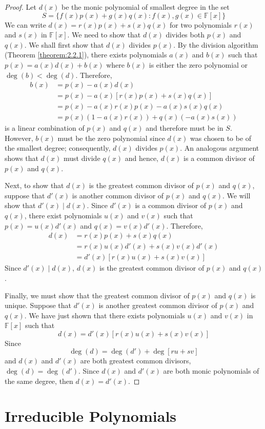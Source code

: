 \documentclass[11pt]{book}
\theoremstyle{definition}\newtheorem{definition}[subsection]{Definition}
\theoremstyle{definition}\newtheorem{example}[subsection]{Example}
\theoremstyle{definition}\newtheorem{notation}[subsection]{Notation}
\theoremstyle{definition}\newtheorem{remark}[subsection]{Remark}
\theoremstyle{theorem}\newtheorem{theorem}[subsection]{Theorem}
\theoremstyle{theorem}\newtheorem{lemma}[subsection]{Lemma}
\theoremstyle{theorem}\newtheorem{proposition}[subsection]{Proposition}
\theoremstyle{theorem}\newtheorem{corollary}[subsection]{Corollary}
\newcommand{\F}{\mathbb{F}}
\begin{document}
\begin{proof}
    Let $d(x)$ be the monic polynomial of smallest degree in the set
    \begin{equation*}
        S = \{f(x)p(x) + g(x)q(x) : f(x), g(x) \in \F[x]\}
    \end{equation*}
    We can write $d(x) = r(x)p(x) + s(x)q(x)$ for two polynomials $r(x)$ and $s(x)$ in $\F[x]$. We need to show that $d(x)$ divides both $p(x)$ and $q(x)$. We shall first show that $d(x)$ divides $p(x)$. By the division algorithm (Theorem \ref{theorem:2.2.1}), there exists polynomials $a(x)$ and $b(x)$ such that $p(x) = a(x)d(x) + b(x)$ where $b(x)$ is either the zero polynomial or $\deg(b) < \deg(d)$. Therefore,
    \begin{align*}
        b(x) &= p(x) - a(x)d(x) \\
        &= p(x) - a(x)[r(x)p(x) + s(x)q(x)] \\
        &= p(x) - a(x)r(x)p(x) - a(x)s(x)q(x) \\
        &= p(x)(1 - a(x)r(x)) + q(x)(-a(x)s(x))
    \end{align*}
    is a linear combination of $p(x)$ and $q(x)$ and therefore must be in $S$. However, $b(x)$ must be the zero polynomial since $d(x)$ was chosen to be of the smallest degree; consequently, $d(x)$ divides $p(x)$. An analogous argument shows that $d(x)$ must divide $q(x)$ and hence, $d(x)$ is a common divisor of $p(x)$ and $q(x)$.

    Next, to show that $d(x)$ is the greatest common divisor of $p(x)$ and $q(x)$, suppose that $d'(x)$ is another common divisor of $p(x)$ and $q(x)$. We will show that $d'(x) \mid d(x)$. Since $d'(x)$ is a common divisor of $p(x)$ and $q(x)$, there exist polynomials $u(x)$ and $v(x)$ such that $p(x) = u(x)d'(x)$ and $q(x) = v(x)d'(x)$. Therefore,
    \begin{align*}
        d(x) &= r(x)p(x) + s(x)q(x) \\
        &= r(x)u(x)d'(x) + s(x)v(x)d'(x) \\
        &= d'(x)[r(x)u(x) + s(x)v(x)]
    \end{align*}
    Since $d'(x) \mid d(x)$, $d(x)$ is the greatest common divisor of $p(x)$ and $q(x)$.

    Finally, we must show that the greatest common divisor of $p(x)$ and $q(x)$ is unique. Suppose that $d'(x)$ is another greatest common divisor of $p(x)$ and $q(x)$. We have just shown that there exists polynomials $u(x)$ and $v(x)$ in $\F[x]$ such that
    \begin{equation*}
        d(x) = d'(x)[r(x)u(x) + s(x)v(x)]
    \end{equation*}
    Since
    \begin{equation*}
        \deg(d) = \deg(d') + \deg[ru + sv]
    \end{equation*}
    and $d(x)$ and $d'(x)$ are both greatest common divisors, $\deg(d) = \deg(d')$. Since $d(x)$ and $d'(x)$ are both monic polynomials of the same degree, then $d(x) = d'(x)$.
\end{proof}

\section{Irreducible Polynomials}

\printindex
\end{document}
